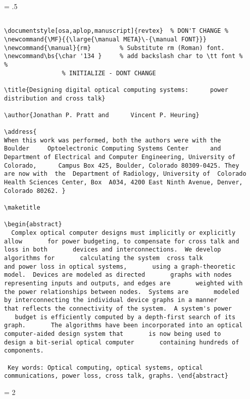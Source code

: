 \newpage
\baselineskip = .5\baselineskip  %
\begin{verbatim}

\documentstyle[osa,aplop,manuscript]{revtex}  % DON'T CHANGE %
\newcommand{\MF}{{\large{\manual META}\-{\manual FONT}}}
\newcommand{\manual}{rm}        % Substitute rm (Roman) font.
\newcommand\bs{\char '134 }     % add backslash char to \tt font %
%
                % INITIALIZE - DONT CHANGE

\title{Designing digital optical computing systems:      power
distribution and cross talk}

\author{Jonathan P. Pratt and      Vincent P. Heuring}

\address{
When this work was performed, both the authors were with the
Boulder     Optoelectronic Computing Systems Center      and
Department of Electrical and Computer Engineering, University of
Colorado,      Campus Box 425, Boulder, Colorado 80309-0425. They
are now with  the  Department of Radiology, University of  Colorado
Health Sciences Center, Box  A034, 4200 East Ninth Avenue, Denver,
Colorado 80262. }

\maketitle

\begin{abstract}
  Complex optical computer designs must implicitly or explicitly
allow       for power budgeting, to compensate for cross talk and
loss in both       devices and interconnections.  We develop
algorithms for       calculating the system  cross talk
and power loss in optical systems,       using a graph-theoretic
model.  Devices are modeled as directed       graphs with nodes
representing inputs and outputs, and edges are       weighted with
the power relationships between nodes.  Systems are       modeled
by interconnecting the individual device graphs in a manner
that reflects the connectivity of the system.  A system's power
   budget is efficiently computed by a depth-first search of its
graph.       The algorithms have been incorporated into an optical
computer-aided design system that       is now being used to
design a bit-serial optical computer       containing hundreds of
components.

 Key words: Optical computing, optical systems, optical
communications, power loss, cross talk, graphs. \end{abstract}

\end{verbatim}
\newpage
\baselineskip = 2\baselineskip  %


